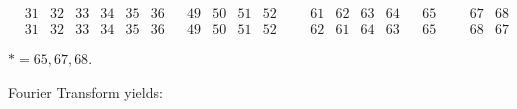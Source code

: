\documentclass[12pt,a4paper]{amsart}
\begin{document}
\begin{align*}
\begin{array}{c|c|c|c|c|c|c}
\begin{array}{r|r|r|r|r|r}
31&32&33&34&35&36\\%
31&32&33&34&35&36\\%
\end{array}%
&
\begin{array}{r|r|r|r}%
49&50&51&52\\%
49&50&51&52\\%
\end{array}%
&&
\begin{array}{rr|rr}%
61&62&63&64\\%
62&61&64&63\\%
\end{array}%
&
\begin{array}{r}%
65\\%
65\\%
\end{array}%
&&
\begin{array}{rr}%
67&68\\%
68&67\\%
\end{array}%
\end{array}
\end{align*}
$* = 65, 67, 68$.

\newpage
\noindent
Fourier Transform yields:
\end{document}
